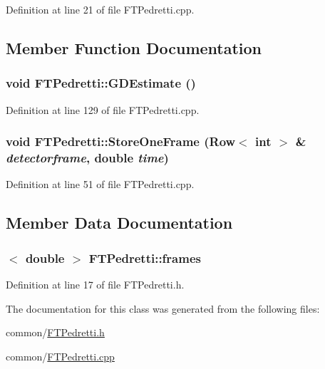 Definition at line 21 of file FTPedretti.cpp.



\subsection{Member Function Documentation}
\hypertarget{classFTPedretti_aa5840df9985ff246fc42318c94c7779a}{
\subsubsection[{GDEstimate}]{\setlength{\rightskip}{0pt plus 5cm}void FTPedretti::GDEstimate ()}}
\label{classFTPedretti_aa5840df9985ff246fc42318c94c7779a}


Definition at line 129 of file FTPedretti.cpp.

\hypertarget{classFTPedretti_a8d57325be576602b6f3eb56c2b4ef19d}{
\subsubsection[{StoreOneFrame}]{\setlength{\rightskip}{0pt plus 5cm}void FTPedretti::StoreOneFrame ({\bf Row}$<$ int $>$ \& {\em detectorframe}, \/  double {\em time})}}
\label{classFTPedretti_a8d57325be576602b6f3eb56c2b4ef19d}


Definition at line 51 of file FTPedretti.cpp.



\subsection{Member Data Documentation}
\hypertarget{classFTPedretti_ae3c6c05c945c59fb8b3df83876faeab2}{
\subsubsection[{frames}]{$<$ double $>$ {\bf FTPedretti::frames}}}
\label{classFTPedretti_ae3c6c05c945c59fb8b3df83876faeab2}


Definition at line 17 of file FTPedretti.h.



The documentation for this class was generated from the following files:\begin{DoxyCompactItemize}
\item 
common/\hyperlink{FTPedretti_8h}{FTPedretti.h}\item 
common/\hyperlink{FTPedretti_8cpp}{FTPedretti.cpp}\end{DoxyCompactItemize}

